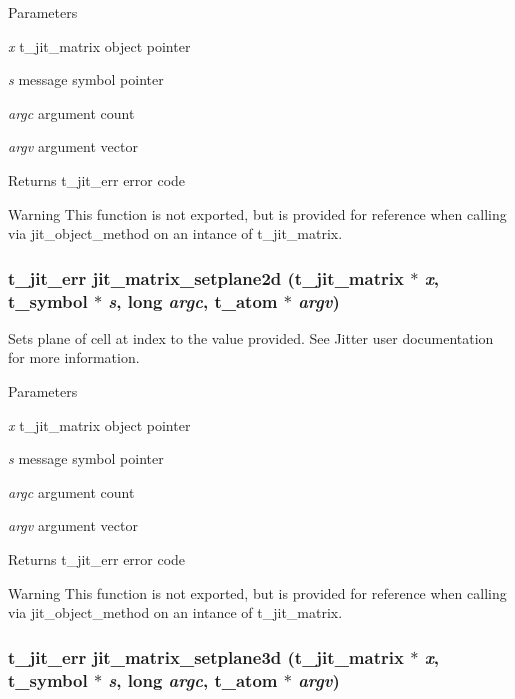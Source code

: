 \begin{DoxyParams}{Parameters}
\item[{\em x}]t\_\-jit\_\-matrix object pointer \item[{\em s}]message symbol pointer \item[{\em argc}]argument count \item[{\em argv}]argument vector\end{DoxyParams}
\begin{DoxyReturn}{Returns}
t\_\-jit\_\-err error code
\end{DoxyReturn}
\begin{DoxyWarning}{Warning}
This function is not exported, but is provided for reference when calling via jit\_\-object\_\-method on an intance of t\_\-jit\_\-matrix. 
\end{DoxyWarning}
\hypertarget{group__matrixmod_gaabbb38a64f1b3c79c3a9db75d18bbe81}{
\subsubsection[{jit\_\-matrix\_\-setplane2d}]{\setlength{\rightskip}{0pt plus 5cm}t\_\-jit\_\-err jit\_\-matrix\_\-setplane2d (t\_\-jit\_\-matrix $\ast$ {\em x}, \/  {\bf t\_\-symbol} $\ast$ {\em s}, \/  long {\em argc}, \/  {\bf t\_\-atom} $\ast$ {\em argv})}}
\label{group__matrixmod_gaabbb38a64f1b3c79c3a9db75d18bbe81}


Sets plane of cell at index to the value provided. See Jitter user documentation for more information.


\begin{DoxyParams}{Parameters}
\item[{\em x}]t\_\-jit\_\-matrix object pointer \item[{\em s}]message symbol pointer \item[{\em argc}]argument count \item[{\em argv}]argument vector\end{DoxyParams}
\begin{DoxyReturn}{Returns}
t\_\-jit\_\-err error code
\end{DoxyReturn}
\begin{DoxyWarning}{Warning}
This function is not exported, but is provided for reference when calling via jit\_\-object\_\-method on an intance of t\_\-jit\_\-matrix. 
\end{DoxyWarning}
\hypertarget{group__matrixmod_ga4bd5c42b1159423126abf0d6f1ca706c}{
\subsubsection[{jit\_\-matrix\_\-setplane3d}]{\setlength{\rightskip}{0pt plus 5cm}t\_\-jit\_\-err jit\_\-matrix\_\-setplane3d (t\_\-jit\_\-matrix $\ast$ {\em x}, \/  {\bf t\_\-symbol} $\ast$ {\em s}, \/  long {\em argc}, \/  {\bf t\_\-atom} $\ast$ {\em argv})}}
\label{group__matrixmod_ga4bd5c42b1159423126abf0d6f1ca706c}


